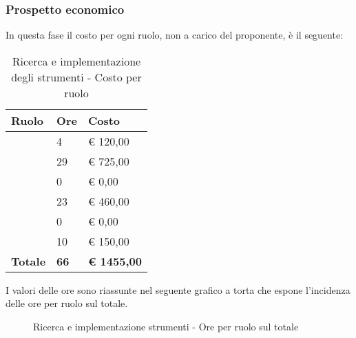 		\subsubsection{Prospetto economico} %
		\label{ssub:prospetto_economico}
		In questa fase il costo per ogni ruolo, non a carico del proponente\gloss{}, è il seguente: \\
			\begin{table}[!htt]
				\begin{center}
					\begin{tabularx}{0.65\textwidth}{|l|l|X|}
						\hline
						\textbf{Ruolo} & \textbf{Ore} & \textbf{Costo} \\
						\hline
						\roleProjectManager & 4 & \euro{} 120,00 \\
						\hline
						\roleAnalyst & 29 & \euro{} 725,00 \\
						\hline
						\roleDesigner & 0 & \euro{} 0,00 \\
						\hline
						\roleAdministrator & 23 & \euro{} 460,00 \\
						\hline
						\roleProgrammer & 0 & \euro{} 0,00 \\
						\hline
						\roleVerifier & 10 & \euro{} 150,00 \\
						\hline
						\textbf{Totale} & \textbf{66} & \textbf{\euro{} 1455,00} \\
						\hline
					\end{tabularx}
				\end{center}
			\caption{Ricerca e implementazione degli strumenti - Costo per ruolo}
			\end{table}

		\noindent
		I valori delle ore sono riassunte nel seguente grafico a torta che espone l’incidenza delle ore per ruolo sul totale.
		\begin{center}
			\begin{figure}[htbp]
			\vspace{0.8cm}
			\caption{Ricerca e implementazione strumenti - Ore per ruolo sul totale}
			\end{figure}
		\end{center}
		
